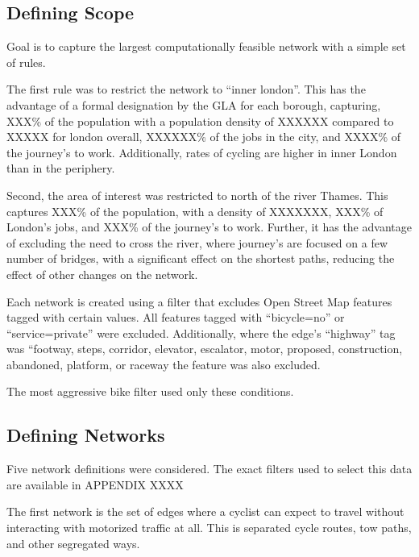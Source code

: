 \documentclass[11pt]{article} %
\begin{document}
\subsection{Defining Scope}



Goal is to capture the largest computationally feasible network with a simple set of rules. 

The first rule was to restrict the network to ``inner london''. This has the advantage of a formal designation by the GLA for each borough, capturing, XXX\% of the population with a population density of XXXXXX compared to XXXXX for london overall, XXXXXX\% of the jobs in the city, and XXXX\% of the journey's to work. Additionally, rates of cycling are higher in inner London than in the periphery. 

Second, the area of interest was restricted to north of the river Thames. This captures XXX\% of the population, with a density of XXXXXXX, XXX\% of London's jobs, and XXX\% of the journey's to work. Further, it has the advantage of excluding the need to cross the river, where journey's are focused on a few number of bridges, with a significant effect on the shortest paths, reducing the effect of other changes on the network. 


Each network is created using a filter that excludes Open Street Map features tagged with certain values. All features tagged with ``bicycle=no'' or ``service=private'' were excluded. Additionally, where the edge's ``highway'' tag was ``footway, steps, corridor, elevator, escalator, motor, proposed, construction, abandoned, platform, or raceway the feature was also excluded. 

The most aggressive bike filter used only these conditions.





 

\subsection{Defining Networks}

Five network definitions were considered. The exact filters used to select this data are available in APPENDIX XXXX 

The first network is the set of edges where a cyclist can expect to travel without interacting with motorized traffic at all. This is separated cycle routes, tow paths, and other segregated ways. 
\end{document}
